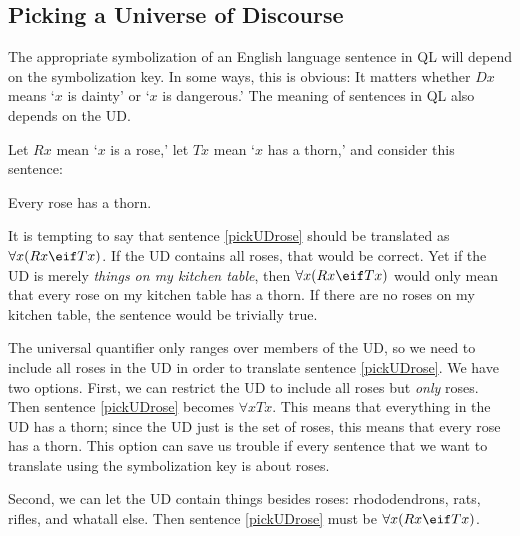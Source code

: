 \begin{table}[h!]
\end{table}

\subsection{Picking a Universe of Discourse}
The appropriate symbolization of an English language sentence in QL will depend on the symbolization key. In some ways, this is obvious: It matters whether $Dx$ means `$x$ is dainty' or `$x$ is dangerous.' The meaning of sentences in QL also depends on the UD.

Let $Rx$ mean `$x$ is a rose,' let $Tx$ mean `$x$ has a thorn,' and consider this sentence:
\begin{earg}
\item[\ex{pickUDrose}] Every rose has a thorn.
\end{earg}

It is tempting to say that sentence \ref{pickUDrose} should be translated as $\forall x(Rx \eif Tx)$. If the UD contains all roses, that would be correct. Yet if the UD is merely \emph{things on my kitchen table}, then $\forall x(Rx \eif Tx)$ would only mean that every rose on my kitchen table has a thorn. If there are no roses on my kitchen table, the sentence would be trivially true.

The universal quantifier only ranges over members of the UD, so we need to include all roses in the UD in order to translate sentence \ref{pickUDrose}. We have two options. First, we can restrict the UD to include all roses but \emph{only} roses. Then sentence \ref{pickUDrose} becomes $\forall x Tx$. This means that everything in the UD has a thorn; since the UD just is the set of roses, this means that every rose has a thorn. This option can save us trouble if every sentence that we want to translate using the symbolization key is about roses.

Second, we can let the UD contain things besides roses: rhododendrons, rats, rifles, and whatall else. Then sentence \ref{pickUDrose} must be $\forall x(Rx \eif Tx)$.

